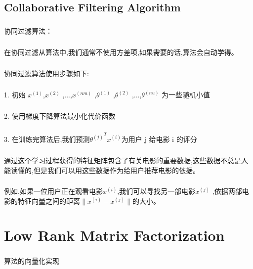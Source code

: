 \documentclass{article}
\begin{document}
\begin{CJK}{UTF8}{gbsn}
\subsection{Collaborative Filtering Algorithm}
\subparagraph{}
协同过滤算法：
\begin{figure}[H]
\label{fig:9997}
\end{figure}
\subparagraph{}
\begin{figure}[H]
\label{fig:9996}
\end{figure}
\subparagraph{}
在协同过滤从算法中,我们通常不使用方差项,如果需要的话,算法会自动学得。
\subparagraph{}
协同过滤算法使用步骤如下:
\begin{figure}[H]
\label{fig:9998}
\end{figure}
\subparagraph{}
1. 初始 $x^{(1)}$,$x^{(2)}$ ,...,$x^{(nm)}$ ,$\theta^{(1)}$ ,$\theta^{(2)}$ ,...,$\theta^{(nu)}$ 为一些随机小值
\subparagraph{}
2. 使用梯度下降算法最小化代价函数
\subparagraph{}
3. 在训练完算法后,我们预测${\theta^{(j)}}^Tx^{(i)}$为用户 j 给电影 i 的评分
\begin{figure}[H]
\label{fig:9999}
\end{figure}
\subparagraph{}
通过这个学习过程获得的特征矩阵包含了有关电影的重要数据,这些数据不总是人能读懂的,但是我们可以用这些数据作为给用户推荐电影的依据。
\subparagraph{}
例如,如果一位用户正在观看电影$x^{(i)}$,我们可以寻找另一部电影$x^{(j)}$ ,依据两部电影的特征向量之间的距离$\parallel{x^{(i)}-x^{(j)}}\parallel$的大小。
\section{Low Rank Matrix Factorization}
\subparagraph{}
算法的向量化实现

\end{CJK}
\end{document}
